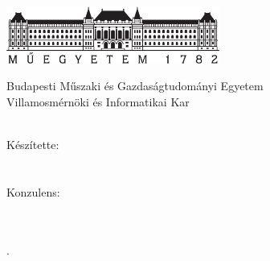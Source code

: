 \begin{titlepage}
  \begin{center}  
  \includegraphics[width=7cm]{./figures/bme_logo.pdf}
  \vspace{0.3cm}
  
  Budapesti Műszaki és Gazdaságtudományi Egyetem \\
  Villamosmérnöki és Informatikai Kar \\
  \viktanszek \\
  \vspace{5cm}
  
  \huge {\vikcim}
  \vspace{1.5cm}
  
  \large {\textbf{\vikdoktipus}}
  \vfill
    
  {\Large 
  	Készítette: \\ \vspace{0.3cm}
  	\vikszerzoVezeteknev{} \vikszerzoKeresztnev \\
	\tdkszerzoB \\
  	\vspace{1.5cm}
  	Konzulens: \\ \vspace{0.3cm}
  	\vikkonzulensA \\
  	\vikkonzulensB \\
  }
  
  \vspace{2cm}
  \large {\tdkev.}
 \end{center}
\end{titlepage}
